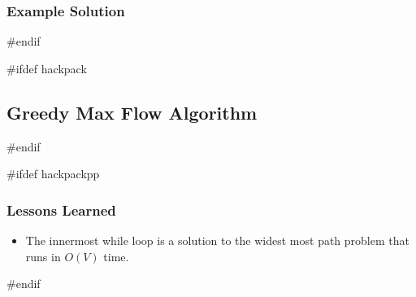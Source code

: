 \subsubsection{Example Solution}
#endif

#ifdef hackpack
\subsection{Greedy Max Flow Algorithm}
#endif

#ifdef hackpackpp
\subsubsection{Lessons Learned}
\begin{itemize}
	\item The innermost while loop is a solution to the widest most path problem that runs in $O(V)$ time.
\end{itemize}
#endif

